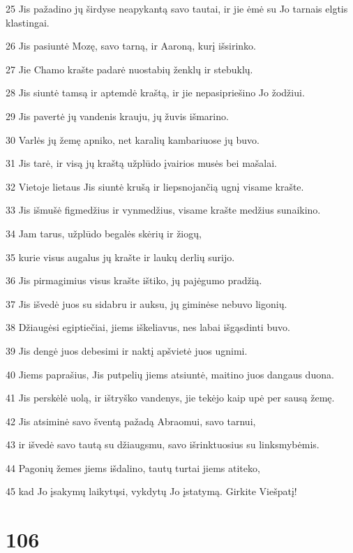 \par 25 Jis pažadino jų širdyse neapykantą savo tautai, ir jie ėmė su Jo tarnais elgtis klastingai. 
\par 26 Jis pasiuntė Mozę, savo tarną, ir Aaroną, kurį išsirinko. 
\par 27 Jie Chamo krašte padarė nuostabių ženklų ir stebuklų. 
\par 28 Jis siuntė tamsą ir aptemdė kraštą, ir jie nepasipriešino Jo žodžiui. 
\par 29 Jis pavertė jų vandenis krauju, jų žuvis išmarino. 
\par 30 Varlės jų žemę apniko, net karalių kambariuose jų buvo. 
\par 31 Jis tarė, ir visą jų kraštą užplūdo įvairios musės bei mašalai. 
\par 32 Vietoje lietaus Jis siuntė krušą ir liepsnojančią ugnį visame krašte. 
\par 33 Jis išmušė figmedžius ir vynmedžius, visame krašte medžius sunaikino. 
\par 34 Jam tarus, užplūdo begalės skėrių ir žiogų, 
\par 35 kurie visus augalus jų krašte ir laukų derlių surijo. 
\par 36 Jis pirmagimius visus krašte ištiko, jų pajėgumo pradžią. 
\par 37 Jis išvedė juos su sidabru ir auksu, jų giminėse nebuvo ligonių. 
\par 38 Džiaugėsi egiptiečiai, jiems iškeliavus, nes labai išgąsdinti buvo. 
\par 39 Jis dengė juos debesimi ir naktį apšvietė juos ugnimi. 
\par 40 Jiems paprašius, Jis putpelių jiems atsiuntė, maitino juos dangaus duona. 
\par 41 Jis perskėlė uolą, ir ištryško vandenys, jie tekėjo kaip upė per sausą žemę. 
\par 42 Jis atsiminė savo šventą pažadą Abraomui, savo tarnui, 
\par 43 ir išvedė savo tautą su džiaugsmu, savo išrinktuosius su linksmybėmis. 
\par 44 Pagonių žemes jiems išdalino, tautų turtai jiems atiteko, 
\par 45 kad Jo įsakymų laikytųsi, vykdytų Jo įstatymą. Girkite Viešpatį!


\chapter{106}


